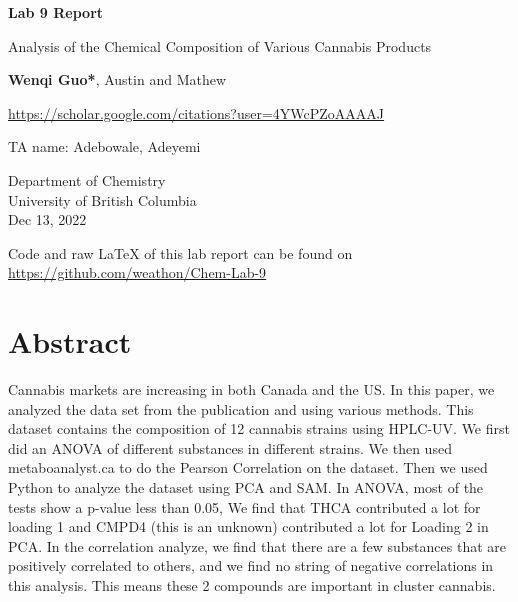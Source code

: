 \documentclass{article}
\begin{document}
\begin{titlepage}
    \begin{center}
        \vspace*{1cm}
            
        \Huge
        \textbf{Lab 9 Report}
            
        \vspace{0.5cm}
        \LARGE
        Analysis of the Chemical Composition of Various Cannabis Products
            
        \vspace{1.5cm}
            
        \textbf{Wenqi Guo*}, Austin and Mathew
        \begin{small}
            \url{https://scholar.google.com/citations?user=4YWcPZoAAAAJ}
        \end{small}

            
        \vfill
            
TA name:
Adebowale, Adeyemi 

            
        \vspace{0.8cm}
            

            
        \Large
        Department of Chemistry\\
        University of British Columbia\\
        Dec 13, 2022
            
    \end{center}
\end{titlepage}
Code and raw \LaTeX \; of this lab report can be found on \url{https://github.com/weathon/Chem-Lab-9}
\section*{Abstract}

Cannabis markets are increasing \cite{Lab Manuel} in both Canada and the US.   In this paper, we analyzed the data set from the publication  \cite{dataset1} and \cite{dataset2} using various methods. This dataset contains the composition of 12 cannabis strains using HPLC-UV. \cite{Lab Manuel, dataset1, dataset2} We first did an ANOVA of different substances in different strains. 
We then used metaboanalyst.ca to do the Pearson Correlation on the dataset. Then we used Python to analyze the dataset using PCA and SAM. In ANOVA, most of the tests show a p-value less than 0.05,  We find that THCA contributed a lot for loading 1 and CMPD4 (this is an unknown) contributed a lot for Loading 2 in PCA. In the correlation analyze, we find that there are a few substances that are positively correlated to others, and we find no string of negative correlations in this analysis. This means these 2 compounds are important in cluster cannabis. 
\end{document}
